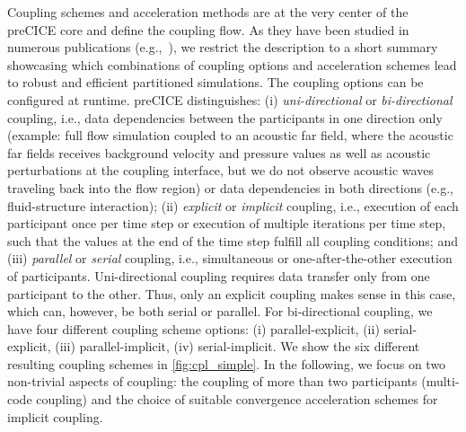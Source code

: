 Coupling schemes and acceleration methods are at the very center of the preCICE core and define the coupling flow. As they have been studied in numerous publications (e.g.,~\cite{Mehl2016, Lindner2015_MVQN, Scheuf:QN}), we restrict the description to 
a short summary showcasing which combinations of coupling options and acceleration
schemes lead to robust and efficient partitioned simulations.
The coupling options can be configured at runtime. preCICE distinguishes: (i) \textit{uni-directional} or \textit{bi-directional} coupling, i.e., data dependencies between the participants in one direction only (example: full flow simulation coupled to an acoustic far field, where the acoustic far fields receives background velocity and pressure values as well as acoustic perturbations at the coupling interface, but we do not observe acoustic waves traveling back into the flow region) or data dependencies in both directions (e.g., fluid-structure interaction); (ii) \textit{explicit} or \textit{implicit} coupling, i.e., execution of each participant once per time step or execution of multiple iterations per time step, such that the values at the end of the time step fulfill all coupling conditions; and (iii) \textit{parallel} or \textit{serial} coupling, i.e., simultaneous
or one-after-the-other execution of participants.
Uni-directional coupling requires data transfer only from one participant to the other. Thus, only an explicit coupling makes sense in this case, which can, however, be both serial or parallel. For bi-directional coupling, we have four different coupling scheme options: (i) parallel-explicit, (ii) serial-explicit, (iii) parallel-implicit, (iv) serial-implicit. We show the six different resulting coupling schemes in
 \autoref{fig:cpl_simple}.
In the following, we focus on two non-trivial aspects of coupling: the coupling of more than two participants (multi-code coupling) and the choice of suitable convergence acceleration schemes for implicit coupling.

